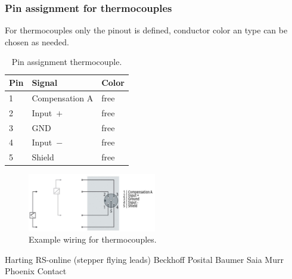 \subsubsection{Pin assignment for thermocouples}
For thermocouples only the pinout is defined, conductor color an type can be chosen as needed.


\begin{table}[H]
\centering
\caption{\label{tab:TCPinout}Pin assignment thermocouple.}
\begin{minipage}{\linewidth}
\centering
\begin{tabular}{@{}p{1cm}p{4cm}p{4cm}@{}}
\toprule
Pin & Signal & Color             \\ \midrule
1   & Compensation A\footnotemark     & free \\ \midrule
2   & Input~$+$           & free \\ \midrule
3   & GND\footnotemark[\value{footnote}]  & free \\ \midrule
4   & Input~$-$           & free  \\ \midrule
5   & Shield            & free  \\ \bottomrule
\end{tabular}
\end{minipage}
\end{table}

\begin{figure}[H]
\centering
\includegraphics[width=0.5\textwidth]{Figures/ThermocoupleWiring.jpg}
\caption{\label{fig:ThermocoupleWiring}Example wiring for thermocouples.}
\end{figure}


Harting
RS-online (stepper flying leads)
Beckhoff
Posital
Baumer
Saia
Murr
Phoenix Contact

\cite{BeckhoffWeb}
\cite{HartingWeb}




